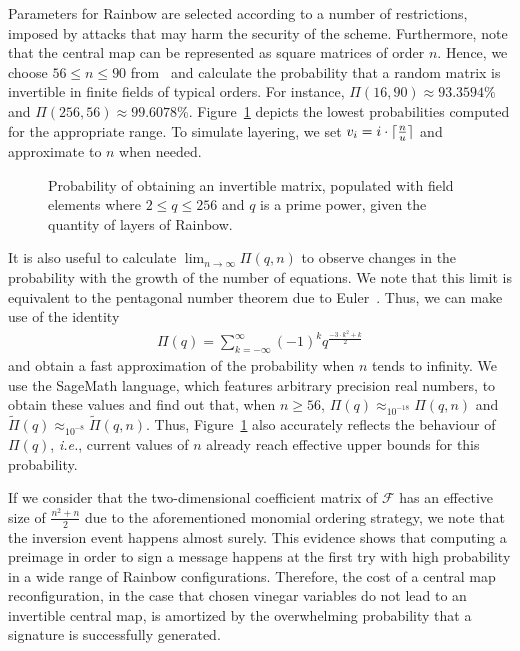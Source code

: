 \documentclass[draft, 12pt, a4paper, oneside]{memoir}
\DeclareMathOperator*{\argmin}{argmin}
\DeclarePairedDelimiter{\ceil}{\lceil}{\rceil}
\theoremstyle{definition}
\theoremstyle{remark}
\begin{document}
Parameters for Rainbow are selected according to a number of restrictions,
imposed by attacks that may harm the security of the scheme. Furthermore, note
that the central map can be represented as square matrices of order $n$. Hence,
we choose $56 \leq n \leq 90$
from~\cite[Tables 6.4, 6.8, 6.13]{Petzoldt:201307} and calculate the
probability that a random matrix is invertible in finite fields of typical
orders. For instance, $\Pi(16, 90) \approx 93.3594\%$ and
$\Pi(256, 56) \approx 99.6078\%$. Figure~\ref{fig:1} depicts the lowest
probabilities computed for the appropriate range. To simulate layering, we set
$v_{i} = i \cdot \ceil{\frac{n}{u}}$ and approximate to $n$ when needed.

\begin{figure}[htbp]
  \subfloat[
    $\argmin_{56 \leq n \leq 90}$ of $\Pi(q, n)$
    and $\widetilde{\Pi}(q, n)$.\label{fig:1a}
  ]{
  }
  \caption{Probability of obtaining an invertible matrix, populated with field
    elements where $2 \leq q \leq 256$ and $q$ is a prime power, given the
    quantity of layers of Rainbow.}\label{fig:1}
\end{figure}

It is also useful to calculate $\lim_{n \to \infty} \Pi(q, n)$ to observe
changes in the probability with the growth of the number of equations. We note that this limit is equivalent to the pentagonal number theorem due to Euler~\cite[Theorem 14.3]{Apostol:2010}. Thus, we can make use of the identity
\begin{align}
  \Pi(q) = \sum_{k = -\infty}^{\infty}
    {(-1)}^{k} q^{\frac{-3 \cdot k^{2} + k}{2}}
\end{align}
and obtain a fast approximation of the probability when $n$ tends to infinity.
We use the SageMath language, which features arbitrary precision real numbers,
to obtain these values and find out that, when $n \geq 56$,
$\Pi(q) \approx_{10^{-18}} \Pi(q, n)$ and
$\widetilde{\Pi}(q) \approx_{10^{-8}} \widetilde{\Pi}(q, n)$.
Thus, Figure~\ref{fig:1} also accurately reflects the behaviour of $\Pi(q)$,
\emph{i.e.}, current values of $n$ already reach effective upper bounds for
this probability.

If we consider that the two-dimensional coefficient matrix of $\mathcal{F}$ has
an effective size of $\frac{n^{2} + n}{2}$ due to the aforementioned monomial
ordering strategy, we note that the inversion event happens almost surely.
This evidence shows that computing a preimage in order to sign a message
happens at the first try with high probability in a wide range of Rainbow
configurations. Therefore, the cost of a central map reconfiguration, in the
case that chosen vinegar variables do not lead to an invertible central map, is
amortized by the overwhelming probability that a signature is successfully
generated.
\end{document}
